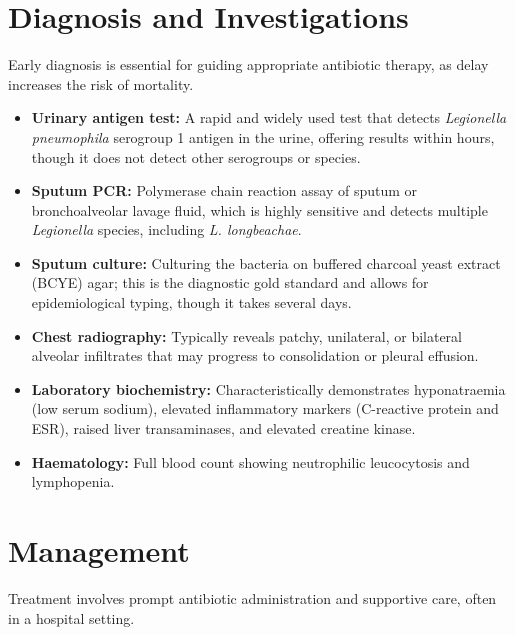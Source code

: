 \section*{Diagnosis and Investigations}
Early diagnosis is essential for guiding appropriate antibiotic therapy, as delay increases the risk of mortality.

\begin{itemize}
    \item \textbf{Urinary antigen test:} A rapid and widely used test that detects \textit{Legionella pneumophila} serogroup 1 antigen in the urine, offering results within hours, though it does not detect other serogroups or species.
    \item \textbf{Sputum PCR:} Polymerase chain reaction assay of sputum or bronchoalveolar lavage fluid, which is highly sensitive and detects multiple \textit{Legionella} species, including \textit{L. longbeachae}.
    \item \textbf{Sputum culture:} Culturing the bacteria on buffered charcoal yeast extract (BCYE) agar; this is the diagnostic gold standard and allows for epidemiological typing, though it takes several days.
    \item \textbf{Chest radiography:} Typically reveals patchy, unilateral, or bilateral alveolar infiltrates that may progress to consolidation or pleural effusion.
    \item \textbf{Laboratory biochemistry:} Characteristically demonstrates hyponatraemia (low serum sodium), elevated inflammatory markers (C-reactive protein and ESR), raised liver transaminases, and elevated creatine kinase.
    \item \textbf{Haematology:} Full blood count showing neutrophilic leucocytosis and lymphopenia.
\end{itemize}

\section*{Management}
Treatment involves prompt antibiotic administration and supportive care, often in a hospital setting.

